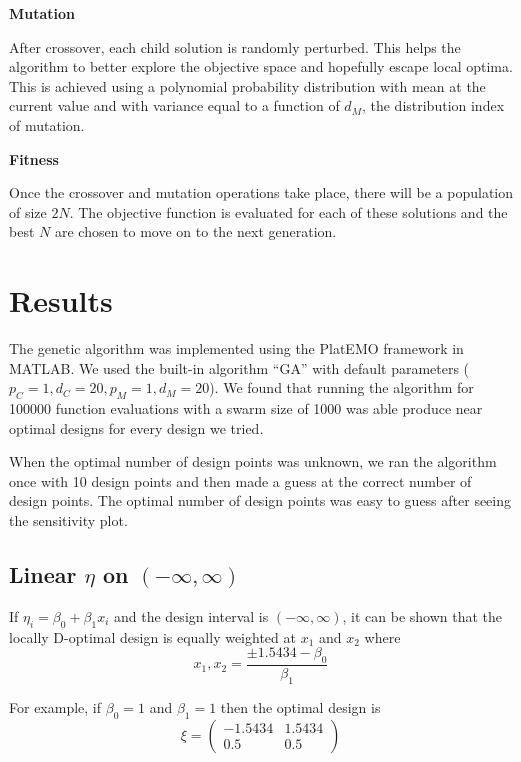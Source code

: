 \documentclass[11pt,a4paper]{article}
\begin{document}
\begin{flushleft}
\textbf{Mutation}
\end{flushleft}
After crossover, each child solution is randomly perturbed. This helps the algorithm to better explore the objective space and hopefully escape local optima. This is achieved using a polynomial probability distribution with mean at the current value and with variance equal to a function of $d_M$, the distribution index of mutation.



\begin{flushleft}
\textbf{Fitness}
\end{flushleft}
Once the crossover and mutation operations take place, there will be a population of size $2N$. The objective function is evaluated for each of these solutions and the best $N$ are chosen to move on to the next generation.



\section{Results}
The genetic algorithm was implemented using the PlatEMO framework in MATLAB. We used the built-in algorithm ``GA'' with default parameters ($p_C = 1, d_C = 20, p_M = 1, d_M = 20$). We found that running the algorithm for 100000 function evaluations with a swarm size of 1000 was able produce near optimal designs for every design we tried. 

When the optimal number of design points was unknown, we ran the algorithm once with 10 design points and then made a guess at the correct number of design points. The optimal number of design points was easy to guess after seeing the sensitivity plot.

\subsection{Linear $\eta$ on $(-\infty, \infty)$}
If $\eta_i = \beta_0 + \beta_1 x_i$ and the design interval is $(-\infty, \infty)$, it can be shown that the locally D-optimal design is equally weighted at $x_1$ and $x_2$ where
$$
x_1, x_2 = \frac{\pm 1.5434 - \beta_0}{\beta_1}
$$

For example, if $\beta_0 = 1$ and $\beta_1 = 1$ then the optimal design is
$$
\xi = \begin{pmatrix}
-1.5434 & 1.5434\\ 0.5 & 0.5
\end{pmatrix}
$$
\end{document}
